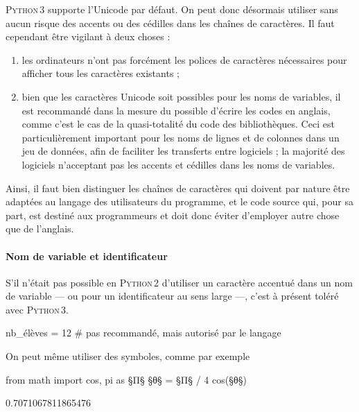 \textsc{Python\,3} supporte l'Unicode par défaut. On peut donc désormais utiliser sans aucun risque des accents ou des cédilles dans les chaînes de caractères. Il faut cependant être vigilant à deux choses :
\begin{enumerate}
	\item les ordinateurs n'ont pas forcément les polices de caractères nécessaires pour afficher tous les caractères existants ;
	\item bien que les caractères Unicode soit possibles pour les noms de variables, il est recommandé dans la mesure du possible d'écrire les codes en anglais, comme c'est le cas de la quasi-totalité du code des bibliothèques. Ceci est particulièrement important pour les noms de lignes et de colonnes dans un jeu de données, afin de faciliter les transferts entre logiciels ; la majorité des logiciels n'acceptant pas les accents et cédilles dans les noms de variables.
\end{enumerate}
Ainsi, il faut bien distinguer les chaînes de caractères qui doivent par nature être adaptées au langage des utilisateurs du programme, et le code source qui, pour sa part, est destiné aux programmeurs et doit donc éviter d'employer autre chose que de l'anglais.


\paragraph{Nom de variable et identificateur} S'il n'était pas possible en \textsc{Python\,2} d'utiliser un caractère accentué dans un nom de variable --- ou pour un identificateur au sens large ---, c'est à présent toléré avec \textsc{Python\,3}.

\begin{nbjupyterin}[before skip=4pt,after skip=6pt]{1}
nb_élèves = 12  # pas recommandé, mais autorisé par le langage
\end{nbjupyterin}

On peut même utiliser des symboles, comme par exemple

\begin{nbjupyterin}[before skip=4pt,after skip=1pt]{2}
from math import cos, pi as §Π§
§θ§ = §Π§ / 4
cos(§θ§)
\end{nbjupyterin}
\begin{nbjupyterout}[after skip=4pt]{2}
0.7071067811865476
\end{nbjupyterout}

